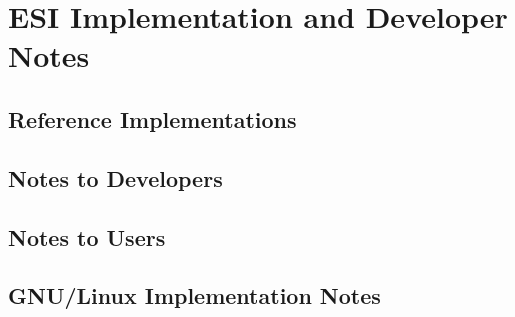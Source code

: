\chapter{ESI Implementation and Developer Notes}

\section{Reference Implementations}

\section{Notes to Developers}

\section{Notes to Users}

\section{GNU/Linux Implementation Notes}

